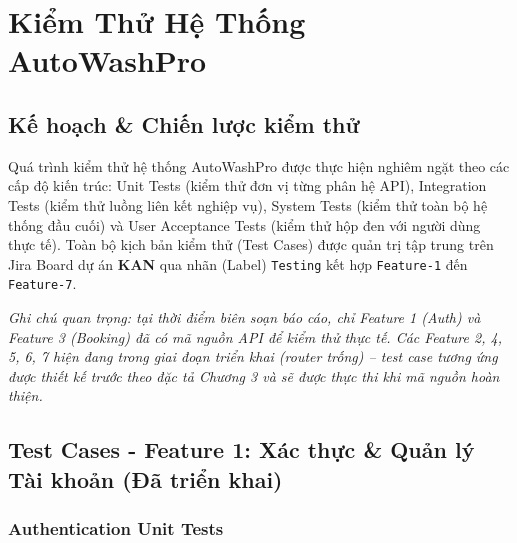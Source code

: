\chapter{Kiểm Thử Hệ Thống AutoWashPro}

\section{Kế hoạch \& Chiến lược kiểm thử}
Quá trình kiểm thử hệ thống AutoWashPro được thực hiện nghiêm ngặt theo các cấp độ kiến trúc: Unit Tests (kiểm thử đơn vị từng phân hệ API), Integration Tests (kiểm thử luồng liên kết nghiệp vụ), System Tests (kiểm thử toàn bộ hệ thống đầu cuối) và User Acceptance Tests (kiểm thử hộp đen với người dùng thực tế). Toàn bộ kịch bản kiểm thử (Test Cases) được quản trị tập trung trên Jira Board dự án \textbf{KAN} qua nhãn (Label) \texttt{Testing} kết hợp \texttt{Feature-1} đến \texttt{Feature-7}.

\textit{Ghi chú quan trọng: tại thời điểm biên soạn báo cáo, chỉ Feature 1 (Auth) và Feature 3 (Booking) đã có mã nguồn API để kiểm thử thực tế. Các Feature 2, 4, 5, 6, 7 hiện đang trong giai đoạn triển khai (router trống) -- test case tương ứng được thiết kế trước theo đặc tả Chương 3 và sẽ được thực thi khi mã nguồn hoàn thiện.}

\section{Test Cases - Feature 1: Xác thực \& Quản lý Tài khoản (Đã triển khai)}

\subsection{Authentication Unit Tests}

